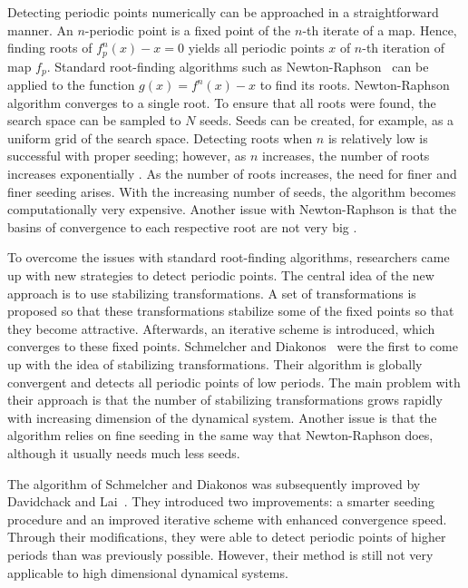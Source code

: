 Detecting periodic points numerically can be approached in a straightforward manner.
An $n$-periodic point is a fixed point of the $n$-th iterate of a map.
Hence, finding roots of $f^{n}_{p}(x)-x = 0$ yields all periodic points $x$ of $n$-th iteration of map $f_{p}$.
Standard root-finding algorithms such as Newton-Raphson~\cite{Haeseler1988} can be applied to the function $g(x) = f^{n}(x)-x$ to find its roots.
Newton-Raphson algorithm converges to a single root. To ensure that all roots were found, the search space can be sampled to $N$ seeds.
Seeds can be created, for example, as a uniform grid of the search space.
Detecting roots when $n$ is relatively low is successful with proper seeding; however, as $n$ increases, the number of roots increases exponentially \cite{Davidchack1999}.
As the number of roots increases, the need for finer and finer seeding arises.
With the increasing number of seeds, the algorithm becomes computationally very expensive.
Another issue with Newton-Raphson is that the basins of convergence to each respective root are not very big \cite{Davidchack1999}.
\par
To overcome the issues with standard root-finding algorithms, researchers came up with new strategies to detect periodic points.
The central idea of the new approach is to use stabilizing transformations.
A set of transformations is proposed so that these transformations stabilize some of the fixed points so that they become attractive.
Afterwards, an iterative scheme is introduced, which converges to these fixed points.
Schmelcher and Diakonos~\cite{Schmelcher1997,Pingel2000, Pingel2001} were the first to come up with the idea of stabilizing transformations.
Their algorithm is globally convergent and detects all periodic points of low periods.
The main problem with their approach is that the number of stabilizing transformations grows rapidly with increasing dimension of the dynamical system.
Another issue is that the algorithm relies on fine seeding in the same way that Newton-Raphson does, although it usually needs much less seeds.
\par
The algorithm of Schmelcher and Diakonos was subsequently improved by Davidchack and Lai~\cite{Davidchack1999, Davidchack2001, Klebanoff2001}.
They introduced two improvements: a smarter seeding procedure and an improved iterative scheme with enhanced convergence speed.
Through their modifications, they were able to detect periodic points of higher periods than was previously possible.
However, their method is still not very applicable to high dimensional dynamical systems.
